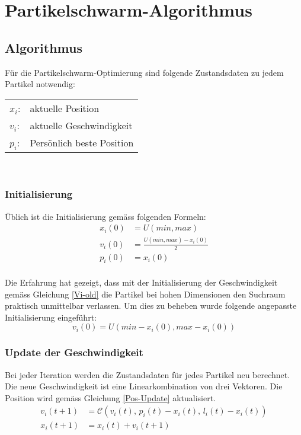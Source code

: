 \section{Partikelschwarm-Algorithmus}

\subsection{Algorithmus}
Für die Partikelschwarm-Optimierung sind folgende Zustandsdaten zu jedem Partikel notwendig: \\
\begin{tabular}{ll}
$x_i$: & aktuelle Position\\
$v_i$: & aktuelle Geschwindigkeit\\
$p_i$: & Persönlich beste Position\\
\end{tabular} \\

\subsubsection{Initialisierung}
Üblich ist die Initialisierung gemäss folgenden Formeln: \\
\begin{align}
	x_i(0) &= U(min,max) \\
	v_i(0) &= \frac{U(min,max) - x_i(0)}{2} \label{Vi-old} \\ 
	p_i(0) &= x_i(0)
\end{align} \\
Die Erfahrung hat gezeigt, dass mit der Initialisierung der Geschwindigkeit gemäss Gleichung \ref{Vi-old} die Partikel bei hohen Dimensionen den Suchraum praktisch unmittelbar verlassen. Um dies zu beheben wurde folgende angepasste Initialisierung eingeführt: \\
\begin{equation}
	v_i(0) = U(min - x_i(0), max - x_i(0))
\end{equation}

\subsubsection{Update der Geschwindigkeit}
Bei jeder Iteration werden die Zustandsdaten für jedes Partikel neu berechnet. Die neue Geschwindigkeit ist eine Linearkombination von drei Vektoren. Die Position wird gemäss Gleichung \ref{Pos-Update} aktualisiert. \\
\begin{align}
	v_{i}(t+1) &= \mathcal{C}(v_i(t),\, p_i(t)-x_i(t),\, l_i(t)-x_i(t)) \\
	x_{i}(t+1) &= x_i(t) + v_i(t+1) \label{Pos-Update}
\end{align}

